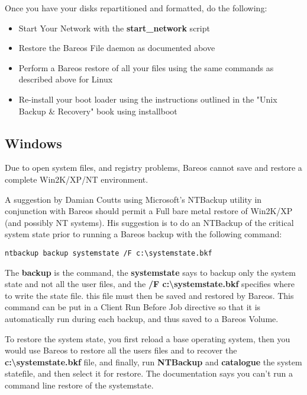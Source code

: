 Once you have your disks repartitioned and formatted, do the following:

\begin{itemize}
\item Start Your Network with the {\bf start\_network} script
\item Restore the Bareos File daemon as documented above
\item Perform a Bareos restore of all your files using the same  commands as
   described above for Linux
\item Re-install your boot loader using the instructions outlined  in the
   "Unix Backup \& Recovery" book  using installboot
\end{itemize}

\subsection{Windows}
\label{Win3233}

Due to open system files, and registry problems, Bareos cannot save and
restore a complete Win2K/XP/NT environment.

A suggestion by Damian Coutts using Microsoft's NTBackup utility in
conjunction with Bareos should permit a Full bare metal restore of Win2K/XP
(and possibly NT systems). His suggestion is to do an NTBackup of the critical
system state prior to running a Bareos backup with the following command:

\footnotesize
\begin{verbatim}
ntbackup backup systemstate /F c:\systemstate.bkf
\end{verbatim}
\normalsize

The {\bf backup} is the command, the {\bf systemstate} says to backup only the
system state and not all the user files, and the {\bf /F
c:\textbackslash{}systemstate.bkf} specifies where to write the state file.
this file must then be saved and restored by Bareos. This command
can be put in a Client Run Before Job directive so that it is automatically
run during each backup, and thus saved to a Bareos Volume.

To restore the system state, you first reload a base operating system, then
you would use Bareos to restore all the users files and to recover the {\bf
c:\textbackslash{}systemstate.bkf} file, and finally, run {\bf NTBackup} and
{\bf catalogue} the system statefile, and then select it for restore. The
documentation says you can't run a command line restore of the systemstate.

